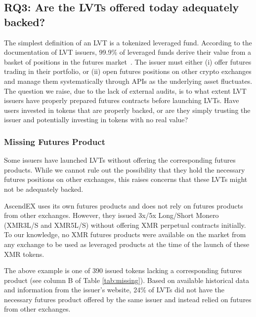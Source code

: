 \subsection*{RQ3: Are the LVTs offered today adequately backed?}\label{subsec:backing}
The simplest definition of an LVT is a tokenized leveraged fund. According to the documentation of LVT issuers, 99.9\% of leveraged funds derive their value from a basket of positions in the futures market~\cite{AscendEX_Guide,MEXC_Guide,Binance_Guide,ByBit_Guide,ByDFi_Guide,FTX_Guide,GateIO_Guide,KuCoin_Guide,Pionex_Guide}. The issuer must either (i) offer futures trading in their portfolio, or (ii) open futures positions on other crypto exchanges and manage them systematically through APIs as the underlying asset fluctuates. The question we raise, due to the lack of external audits, is to what extent LVT issuers have properly prepared futures contracts before launching LVTs. Have users invested in tokens that are properly backed, or are they simply trusting the issuer and potentially investing in tokens with no real value?

\subsubsection{Missing Futures Product}
Some issuers have launched LVTs without offering the corresponding futures products. While we cannot rule out the possibility that they hold the necessary futures positions on other exchanges, this raises concerns that these LVTs might not be adequately backed.

\begin{example}
	AscendEX uses its own futures products and does not rely on futures products from other exchanges. However, they issued 3x/5x Long/Short Monero (XMR3L/S and XMR5L/S) without offering XMR perpetual contracts initially. To our knowledge, no XMR futures products were available on the market from any exchange to be used as leveraged products at the time of the launch of these XMR tokens.
\end{example}

The above example is one of 390 issued tokens lacking a corresponding futures product (see column B of Table \ref{tab:missing}). Based on available historical data and information from the issuer's website, 24\% of LVTs did not have the necessary futures product offered by the same issuer and instead relied on futures from other exchanges.


